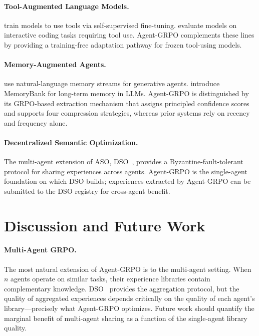 \documentclass[11pt]{article}
\begin{document}
\paragraph{Tool-Augmented Language Models.}
\cite{schick2023toolformer} train models to use tools via self-supervised
fine-tuning. \cite{yang2024intercode} evaluate models on interactive coding
tasks requiring tool use. Agent-GRPO complements these lines by providing a
training-free adaptation pathway for frozen tool-using models.

\paragraph{Memory-Augmented Agents.}
\cite{park2023generative} use natural-language memory streams for generative
agents. \cite{zhong2024memorybank} introduce MemoryBank for long-term memory
in LLMs. Agent-GRPO is distinguished by its GRPO-based extraction mechanism
that assigns principled confidence scores and supports four compression
strategies, whereas prior systems rely on recency and frequency alone.

\paragraph{Decentralized Semantic Optimization.}
The multi-agent extension of ASO, DSO~\cite{hanzo2026dso}, provides a
Byzantine-fault-tolerant protocol for sharing experiences across agents. Agent-GRPO
is the single-agent foundation on which DSO builds; experiences extracted by
Agent-GRPO can be submitted to the DSO registry for cross-agent benefit.

\section{Discussion and Future Work}
\label{sec:discussion}

\paragraph{Multi-Agent GRPO.}
The most natural extension of Agent-GRPO is to the multi-agent setting. When
$n$ agents operate on similar tasks, their experience libraries contain
complementary knowledge. DSO~\cite{hanzo2026dso} provides the aggregation
protocol, but the quality of aggregated experiences depends critically on the
quality of each agent's library---precisely what Agent-GRPO optimizes. Future
work should quantify the marginal benefit of multi-agent sharing as a function
of the single-agent library quality.
\end{document}

